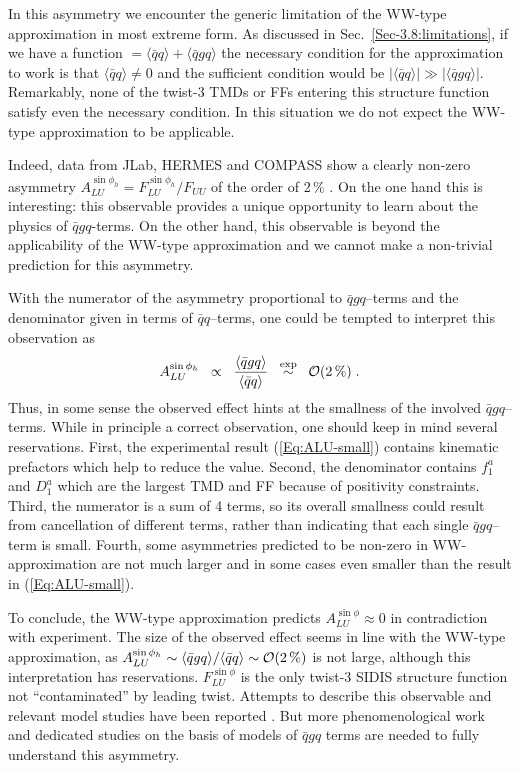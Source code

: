 \documentclass[a4paper,11pt]{article}
\newcommand{\blue}[1]{{\color{blue} #1}}
\newcommand{\be}{\begin{equation}}
\newcommand{\ee}{\end{equation}}
\newcommand{\la}{\langle}
\newcommand{\ra}{\rangle}
\newcommand{\ps}[1]{\blue{ #1}}
\begin{document}
\ps{In this asymmetry we encounter the generic limitation of the 
WW-type approximation in most extreme form. As discussed in 
Sec.~\ref{Sec-3.8:limitations}, if we have a function
$=\la\bar{q}q\ra + \la\bar{q}gq\ra$ the necessary condition for 
the approximation to work is that $\la\bar{q}q\ra \neq 0$ and the 
sufficient condition would be $|\la\bar{q}q\ra|\gg|\la\bar{q}gq\ra|$.
Remarkably, none of the twist-3 TMDs or FFs entering this structure 
function satisfy even the necessary condition. In this situation we 
do not expect the WW-type approximation to be applicable. 

Indeed, data from JLab, HERMES and COMPASS show a clearly non-zero 
asymmetry $A_{LU}^{\sin\phi_h} = F_{LU}^{\sin\phi_h}/F_{UU}$ of the order of 2\,$\%$ 
\cite{Avakian:2003pk,Airapetian:2006rx,Gohn:2009zz,
Aghasyan:2011ha,Adolph:2014pwc,Gohn:2014zbz}. 
On the one hand this is interesting: this observable provides a unique 
opportunity to learn about the physics of $\bar{q}gq$-terms. On the other
hand, this observable is beyond the applicability of the WW-type approximation
and we cannot make a non-trivial prediction for this asymmetry.

With the numerator of the asymmetry proportional to $\bar{q}gq$--terms
and the denominator given in terms of $\bar{q} q$--terms, one could be 
tempted to interpret this observation as
\be\label{Eq:ALU-small}
    	A_{LU}^{\sin\phi_h}
	\;\; \propto \;\;\frac{\la\bar{q}gq\ra}{\la\bar{q}q\ra}
    	\;\;\stackrel{\rm exp}{\sim} \;\; 
	{\cal O}(2\,\%)
    	\;.
\ee
Thus, in some sense the observed effect hints at the smallness of the 
involved $\bar{q}gq$--terms. While in principle a correct observation,
one should keep in mind several reservations. First,
the experimental result (\ref{Eq:ALU-small})
contains kinematic prefactors which help to reduce the value. 
Second, the denominator contains $f_1^a$ and $D_1^a$ which are the
largest TMD and FF because of positivity constraints. Third, the 
numerator is a sum of 4 terms, so its overall smallness could result 
from cancellation of different terms, rather than indicating that 
each single $\bar{q}gq$--term is small. Fourth, some asymmetries 
predicted to be non-zero in WW-approximation are not much larger and 
in some cases even smaller than the result in (\ref{Eq:ALU-small}).

To conclude, the WW-type approximation predicts $A_{LU}^{\sin\phi}\approx 0$
in contradiction with experiment. The size of the observed effect seems
in line with the WW-type approximation, as
$A_{LU}^{\sin\phi_h}\sim\la\bar{q}gq\ra/\la\bar{q}q\ra \sim {\cal O}(2\,\%)$
is not large, although this interpretation has reservations.
$F_{LU}^{\sin\phi}$ is the only twist-3 SIDIS structure function not 
``contaminated'' by leading twist. Attempts to describe this observable
and relevant model studies have been reported 
\cite{Efremov:2002qh,
Lorce:2014hxa,
Schweitzer:2003uy,Ohnishi:2003mf,Cebulla:2007ej,
Efremov:2002ut,Afanasev:2003ze,Yuan:2003gu,Gamberg:2003pz,Metz:2004je,Afanasev:2006gw,Mao:2012dk,Mao:2014dva,Courtoy:2014xea,Yang:2016mxl}.
But more phenomenological work and dedicated studies on the basis of models 
of $\bar{q}gq$ terms are needed to fully understand this asymmetry.}
\end{document}
